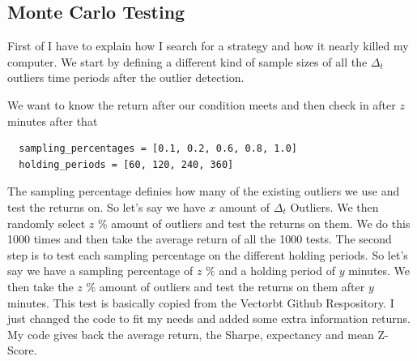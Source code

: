 \documentclass[12pt]{article}
\begin{document}
\subsection{Monte Carlo Testing}

First of I have to explain how I search for a strategy and how it nearly killed my computer. 
We start by defining a different kind of sample sizes of all the $\Delta_t$ outliers time periods after the outlier detection.


We want to know the return after our condition meets and then check in after $z$ minutes after that
\begin{verbatim}
  sampling_percentages = [0.1, 0.2, 0.6, 0.8, 1.0]
  holding_periods = [60, 120, 240, 360]  
\end{verbatim}

The sampling percentage definies how many of the existing outliers we use and test the returns on. So let's say we have $x$ amount of $\Delta_t$ Outliers. We then randomly select $z$ \% amount of outliers and test the returns on them. We do this 1000 times and then take the average return of all the 1000 tests.
The second step is to test each sampling percentage on the different holding periods. So let's say we have a sampling percentage of $z$ \% and a holding period of $y$ minutes. We then take the $z$ \% amount of outliers and test the returns on them after $y$ minutes. This test is basically copied from the Vectorbt Github Respository. I just changed the code to fit my needs and added some extra information returns. My code gives back the average return, the Sharpe, expectancy and mean Z-Score.
\end{document}
